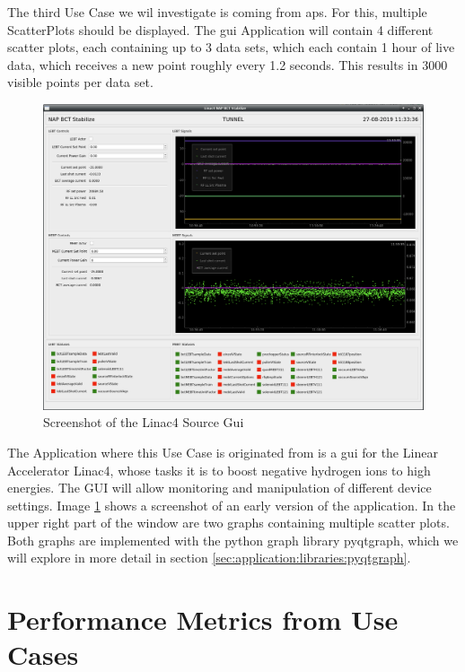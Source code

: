 The third Use Case we wil investigate is coming from \gls{aps}. For this, multiple ScatterPlots should be displayed. The \gls{gui} Application will contain 4 different scatter plots, each containing up to 3 data sets, which each contain 1 hour of live data, which receives a new point roughly every 1.2 seconds. This results in 3000 visible points per data set.

\begin{figure}[h]
    \centering
    \includegraphics[width=14cm]{resources/img/Linac4SourceGui}
    \caption{Screenshot of the Linac4 Source Gui}
    \label{fig:linac4sourcegui}
\end{figure}

The Application where this Use Case is originated from is a \gls{gui} for the Linear Accelerator Linac4, whose tasks it is to boost negative hydrogen ions to high energies. The GUI will allow monitoring and manipulation of different device settings. Image \ref{fig:linac4sourcegui} shows a screenshot of an early version of the application. In the upper right part of the window are two graphs containing multiple scatter plots. Both graphs are implemented with the python graph library pyqtgraph, which we will explore in more detail in section \ref{sec:application:libraries:pyqtgraph}.
\cite{LinacFour,LinacFourGuiPres}


\section{Performance Metrics from Use Cases}
\label{sec:usecases:metrics}

